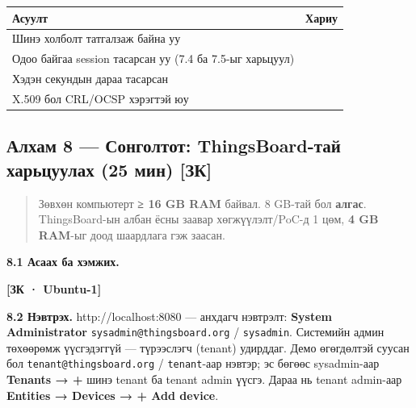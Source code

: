 \begingroup\scriptsize\begin{longtable}[]{@{}ll@{}}
\toprule
Асуулт & Хариу\tabularnewline
\midrule
\endhead
Шинэ холболт татгалзаж байна уу &\tabularnewline
Одоо байгаа session тасарсан уу (7.4 ба 7.5-ыг харьцуул) &\tabularnewline
Хэдэн секундын дараа тасарсан &\tabularnewline
X.509 бол CRL/OCSP хэрэгтэй юу &\tabularnewline
\bottomrule
\end{longtable}\endgroup

\hypertarget{ux430ux43bux445ux430ux43c-8-ux441ux43eux43dux433ux43eux43bux442ux43eux442-thingsboard-ux442ux430ux439-ux445ux430ux440ux44cux446ux443ux443ux43bux430ux445-25-ux43cux438ux43d-ux437ux43a}{%
\subsection{Алхам 8 --- Сонголтот: ThingsBoard-тай харьцуулах (25 мин) {[}ЗК{]}}\label{ux430ux43bux445ux430ux43c-8-ux441ux43eux43dux433ux43eux43bux442ux43eux442-thingsboard-ux442ux430ux439-ux445ux430ux440ux44cux446ux443ux443ux43bux430ux445-25-ux43cux438ux43d-ux437ux43a}}

\begin{quote}
Зөвхөн компьютерт \textbf{≥ 16 GB RAM} байвал. 8 GB-тай бол \textbf{алгас}. ThingsBoard-ын албан ёсны заавар хөгжүүлэлт/PoC-д 1 цөм, \textbf{4 GB RAM}-ыг доод шаардлага гэж заасан.
\end{quote}

\textbf{8.1 Асаах ба хэмжих.}

\textbf{{[}ЗК · Ubuntu-1{]}}

\begin{Shaded}
\begin{Highlighting}[]
\KeywordTok{\textbackslash{}}
\end{Highlighting}
\end{Shaded}

\textbf{8.2 Нэвтрэх.} http://localhost:8080 --- анхдагч нэвтрэлт: \textbf{System Administrator} \texttt{sysadmin@thingsboard.\allowbreak{}org} / \texttt{sysadmin}. Системийн админ төхөөрөмж үүсгэдэггүй --- түрээслэгч (tenant) удирддаг. Демо өгөгдөлтэй суусан бол \texttt{tenant@thingsboard.\allowbreak{}org} / \texttt{tenant}-аар нэвтэр; эс бөгөөс sysadmin-аар \textbf{Tenants → +} шинэ tenant ба tenant admin үүсгэ. Дараа нь tenant admin-аар \textbf{Entities → Devices → + Add device}.

